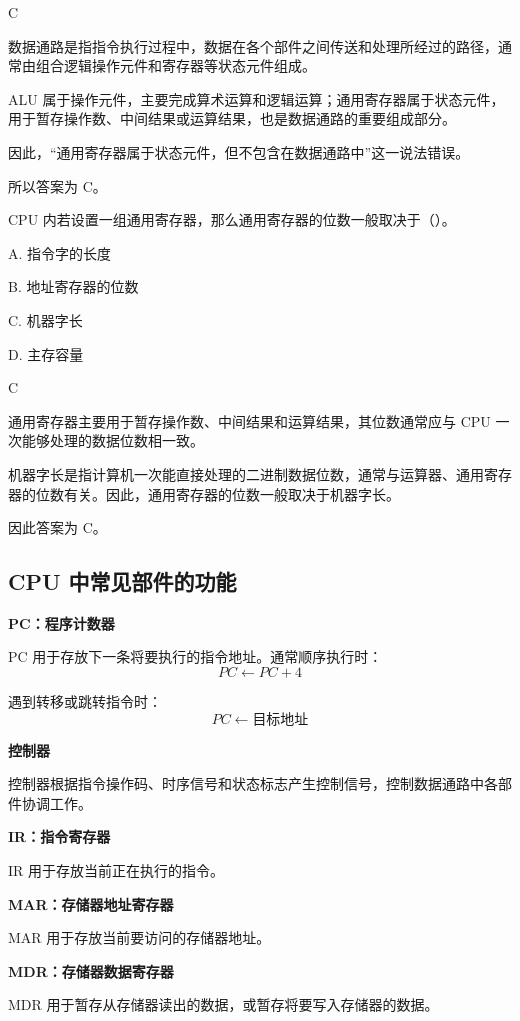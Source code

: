 \begin{answer}
C
\end{answer}

\begin{analysisenv}
数据通路是指指令执行过程中，数据在各个部件之间传送和处理所经过的路径，通常由组合逻辑操作元件和寄存器等状态元件组成。

ALU 属于操作元件，主要完成算术运算和逻辑运算；通用寄存器属于状态元件，用于暂存操作数、中间结果或运算结果，也是数据通路的重要组成部分。

因此，“通用寄存器属于状态元件，但不包含在数据通路中”这一说法错误。

所以答案为 C。
\end{analysisenv}



\begin{question}
CPU 内若设置一组通用寄存器，那么通用寄存器的位数一般取决于（）。

A. 指令字的长度

B. 地址寄存器的位数

C. 机器字长

D. 主存容量
\end{question}

\begin{answer}
C
\end{answer}

\begin{analysisenv}
通用寄存器主要用于暂存操作数、中间结果和运算结果，其位数通常应与 CPU 一次能够处理的数据位数相一致。

机器字长是指计算机一次能直接处理的二进制数据位数，通常与运算器、通用寄存器的位数有关。因此，通用寄存器的位数一般取决于机器字长。

因此答案为 C。
\end{analysisenv}






\subsection{CPU 中常见部件的功能}

\begin{knowledge}
\textbf{PC：程序计数器}

PC 用于存放下一条将要执行的指令地址。通常顺序执行时：
\[
PC \leftarrow PC+4
\]

遇到转移或跳转指令时：
\[
PC \leftarrow \text{目标地址}
\]

\textbf{控制器}

控制器根据指令操作码、时序信号和状态标志产生控制信号，控制数据通路中各部件协调工作。

\textbf{IR：指令寄存器}

IR 用于存放当前正在执行的指令。

\textbf{MAR：存储器地址寄存器}

MAR 用于存放当前要访问的存储器地址。

\textbf{MDR：存储器数据寄存器}

MDR 用于暂存从存储器读出的数据，或暂存将要写入存储器的数据。
\end{knowledge}

